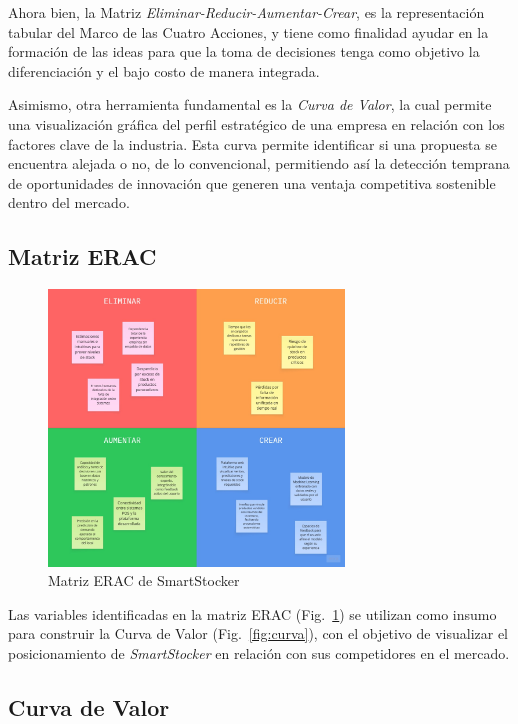 Ahora bien, la Matriz \emph{Eliminar-Reducir-Aumentar-Crear}, es la representación tabular del Marco de las Cuatro Acciones, y tiene como finalidad ayudar en la formación de las ideas para que la toma de decisiones tenga como objetivo la diferenciación y el bajo costo de manera integrada.

Asimismo, otra herramienta fundamental es la \emph{Curva de Valor}, la cual permite una visualización gráfica del perfil estratégico de una empresa en relación con los factores clave de la industria. Esta curva permite identificar si una propuesta se encuentra alejada o no, de lo convencional, permitiendo así la detección temprana de oportunidades de innovación que generen una ventaja competitiva sostenible dentro del mercado.


\subsection{Matriz ERAC}\label{sec:erac}

\begin{figure}[htbp]
    \centering
    \includegraphics[width=0.7\textwidth]{images/matrizEric.jpeg}
    \caption{Matriz ERAC de SmartStocker}
    \label{fig:eric}
\end{figure}

Las variables identificadas en la matriz ERAC (Fig.~\ref{fig:eric}) se utilizan como insumo para construir la Curva de Valor (Fig.~\ref{fig:curva}), con el objetivo de visualizar el posicionamiento de \emph{SmartStocker} en relación con sus competidores en el mercado.

\FloatBarrier

\clearpage
\subsection{Curva de Valor}\label{sec:curva-valor}

